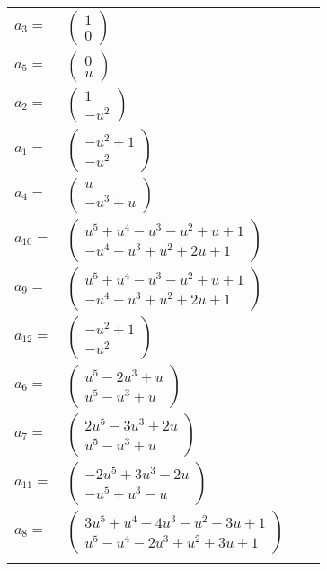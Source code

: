 \documentclass[1p]{elsarticle_modified}
\theoremstyle{definition}
\begin{document}
\begin{tabular}{m{7pt} m{180pt} m{7pt} m{180pt} }
\flushright $a_{3}=$&$\begin{pmatrix}1\\0\end{pmatrix}$ \\
\flushright $a_{5}=$&$\begin{pmatrix}0\\u\end{pmatrix}$ \\
\flushright $a_{2}=$&$\begin{pmatrix}1\\- u^2\end{pmatrix}$ \\
\flushright $a_{1}=$&$\begin{pmatrix}- u^2+1\\- u^2\end{pmatrix}$ \\
\flushright $a_{4}=$&$\begin{pmatrix}u\\- u^3+u\end{pmatrix}$ \\
\flushright $a_{10}=$&$\begin{pmatrix}u^5+u^4- u^3- u^2+u+1\\- u^4- u^3+u^2+2 u+1\end{pmatrix}$ \\
\flushright $a_{9}=$&$\begin{pmatrix}u^5+u^4- u^3- u^2+u+1\\- u^4- u^3+u^2+2 u+1\end{pmatrix}$ \\
\flushright $a_{12}=$&$\begin{pmatrix}- u^2+1\\- u^2\end{pmatrix}$ \\
\flushright $a_{6}=$&$\begin{pmatrix}u^5-2 u^3+u\\u^5- u^3+u\end{pmatrix}$ \\
\flushright $a_{7}=$&$\begin{pmatrix}2 u^5-3 u^3+2 u\\u^5- u^3+u\end{pmatrix}$ \\
\flushright $a_{11}=$&$\begin{pmatrix}-2 u^5+3 u^3-2 u\\- u^5+u^3- u\end{pmatrix}$ \\
\flushright $a_{8}=$&$\begin{pmatrix}3 u^5+u^4-4 u^3- u^2+3 u+1\\u^5- u^4-2 u^3+u^2+3 u+1\end{pmatrix}$\\&\end{tabular}
\end{document}

